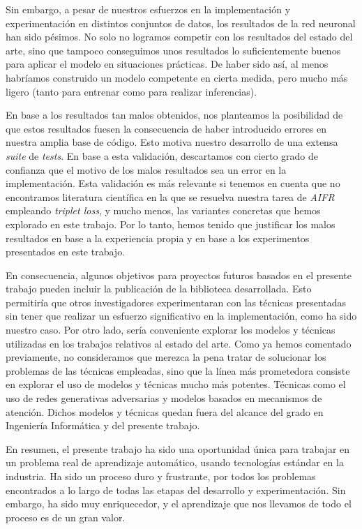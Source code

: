 Sin embargo, a pesar de nuestros esfuerzos en la implementación y experimentación en distintos conjuntos de datos, los resultados de la red neuronal han sido pésimos. No solo no logramos competir con los resultados del estado del arte, sino que tampoco conseguimos unos resultados lo suficientemente buenos para aplicar el modelo en situaciones prácticas. De haber sido así, al menos habríamos construido un modelo competente en cierta medida, pero mucho más ligero (tanto para entrenar como para realizar inferencias).

En base a los resultados tan malos obtenidos, nos planteamos la posibilidad de que estos resultados fuesen la consecuencia de haber introducido errores en nuestra amplia base de código. Esto motiva nuestro desarrollo de una extensa \textit{suite} de \textit{tests}. En base a esta validación, descartamos con cierto grado de confianza que el motivo de los malos resultados sea un error en la implementación. Esta validación es más relevante si tenemos en cuenta que no encontramos literatura científica en la que se resuelva nuestra tarea de \textit{AIFR} empleando \textit{triplet loss}, y mucho menos, las variantes concretas que hemos explorado en este trabajo. Por lo tanto, hemos tenido que justificar los malos resultados en base a la experiencia propia y en base a los experimentos presentados en este trabajo.

En consecuencia, algunos objetivos para proyectos futuros basados en el presente trabajo pueden incluir la publicación de la biblioteca desarrollada. Esto permitiría que otros investigadores experimentaran con las técnicas presentadas sin tener que realizar un esfuerzo significativo en la implementación, como ha sido nuestro caso. Por otro lado, sería conveniente explorar los modelos y técnicas utilizadas en los trabajos relativos al estado del arte. Como ya hemos comentado previamente, no consideramos que merezca la pena tratar de solucionar los problemas de las técnicas empleadas, sino que la línea más prometedora consiste en explorar el uso de modelos y técnicas mucho más potentes. Técnicas como el uso de redes generativas adversarias y modelos basados en mecanismos de atención. Dichos modelos y técnicas quedan fuera del alcance del grado en Ingeniería Informática y del presente trabajo.

En resumen, el presente trabajo ha sido una oportunidad única para trabajar en un problema real de aprendizaje automático, usando tecnologías estándar en la industria. Ha sido un proceso duro y frustrante, por todos los problemas encontrados a lo largo de todas las etapas del desarrollo y experimentación. Sin embargo, ha sido muy enriquecedor, y el aprendizaje que nos llevamos de todo el proceso es de un gran valor.

